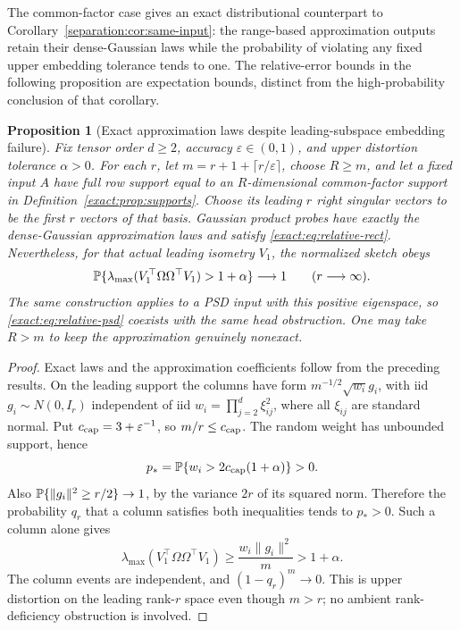 \documentclass[11pt,a4paper]{article}
\newtheorem{proposition}[theorem]{Proposition}
\theoremstyle{definition}\newtheorem{definition}[theorem]{Definition}
\theoremstyle{remark}\newtheorem{remark}[theorem]{Remark}
\numberwithin{equation}{section}
\newcommand{\Id}{I}\newcommand{\F}{\mathrm F}
\newcommand{\norm}[1]{\lVert#1\rVert}\newcommand{\ip}[2]{\langle#1,#2\rangle}
\begin{document}
The common-factor case gives an exact distributional counterpart to
Corollary~\ref{separation:cor:same-input}: the range-based approximation
outputs retain their dense-Gaussian laws while the probability of
violating any fixed upper embedding tolerance tends to one. The
relative-error bounds in the following proposition are expectation
bounds, distinct from the high-probability conclusion of that corollary.
\begin{proposition}[Exact approximation laws despite leading-subspace embedding failure]
\label{exact:prop:separation}
Fix tensor order $d\ge2$, accuracy $\varepsilon\in(0,1)$, and upper
distortion tolerance $\alpha>0$. For each $r$, let
$m=r+1+\lceil r/\varepsilon\rceil$, choose $R\ge m$, and let a fixed input
$A$ have full row support equal to an $R$-dimensional common-factor support
in Definition~\ref{exact:prop:supports}. Choose its leading $r$ right
singular vectors to be the first $r$ vectors of that basis. Gaussian product
probes have exactly the dense-Gaussian approximation laws and satisfy
\eqref{exact:eq:relative-rect}. Nevertheless, for that actual leading
isometry $V_1$, the normalized sketch obeys
\[
 \mathbb P\{\lambda_{\max}(V_1^\top\Omega\Omega^\top V_1)>1+\alpha\}
 \longrightarrow1\qquad(r\longrightarrow\infty).
\]
The same construction applies to a PSD input with this positive eigenspace,
so \eqref{exact:eq:relative-psd} coexists with the same head obstruction.
One may take $R>m$ to keep the approximation genuinely nonexact.
\end{proposition}
\begin{proof}
Exact laws and the approximation coefficients follow from the preceding
results. On the leading support the columns have form
$m^{-1/2}\sqrt{w_i}g_i$, with iid $g_i\sim N(0,\Id_r)$ independent of
iid $w_i=\prod_{j=2}^d\xi_{ij}^2$, where all $\xi_{ij}$ are standard
normal. Put ${c_{\rm cap}}=3+\varepsilon^{-1}$, so $m/r\le{c_{\rm cap}}$.
The random weight has unbounded support, hence
\[
 p_*=\mathbb P\{w_i>2{c_{\rm cap}}(1+\alpha)\}>0.
\]
Also $\Pp\{\norm{g_i}^2\ge r/2\}\to1$, by the variance $2r$ of its
squared norm. Therefore the probability $q_r$ that a column satisfies
both inequalities tends to $p_*>0$. Such a column alone gives
\[
 \lambda_{\max}(V_1^\top\Omega\Omega^\top V_1)
 \ge\frac{w_i\norm{g_i}^2}{m}>1+\alpha.
\]
The column events are independent, and $(1-q_r)^m\to0$. This is upper
distortion on the leading rank-$r$ space even though $m>r$; no ambient
rank-deficiency obstruction is involved.
\end{proof}
\end{document}

